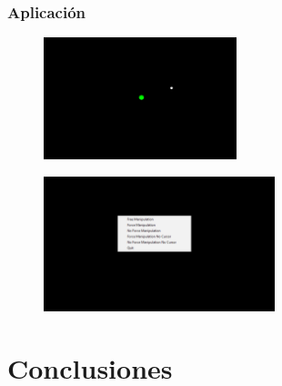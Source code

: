 \documentclass{beamer}
\begin{document}
\begin{frame}
	\frametitle{Aplicación}
	
	\begin{figure}
		\centering
	
			\includegraphics[width=0.5\textwidth]{cursor}
	
	\end{figure}
	\begin{figure}
	\centering
	
	\includegraphics[width=0.6\textwidth]{menu}

\end{figure}
\end{frame}

\section{Conclusiones}
\end{document}
